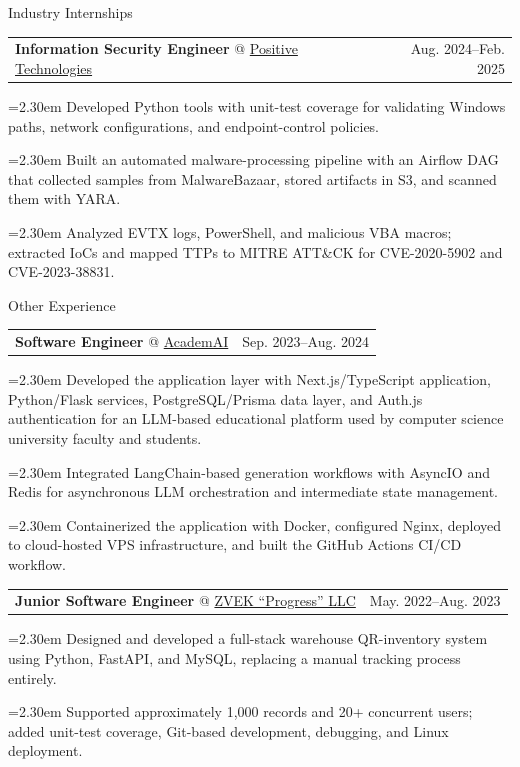 \documentclass[11pt,a4paper]{article}
\makeatletter
\newcommand{\cvrow}[2]{%
  \noindent
  \begin{minipage}[t]{0.145\textwidth}
    \vspace{0pt}%
    \raggedright
    \fontsize{10.5}{12.5}\selectfont
    #1
  \end{minipage}%
  \hfill
  \begin{minipage}[t]{0.835\textwidth}
    \vspace{0pt}%
    #2
  \end{minipage}\par
}
\newcommand{\workentry}[2]{%
  \noindent
  \begin{tabularx}{\linewidth}
    {@{}X@{\hspace{0.8em}}r@{}}
    #1 & \small #2
  \end{tabularx}\par
  \vspace{0.15em}
}
\newcommand{\workproject}[1]{%
  \noindent
  \hangindent=2.30em
  \hangafter=1
  \hspace*{1.15em}\makebox[1.15em][l]{$\diamond$}#1\par
  \vspace{0.12em}
}
\makeatother
\begin{document}
\cvrow{Industry Internships}{%
  \workentry
    {\textbf{Information Security Engineer} @
    \href{https://global.ptsecurity.com/en/}{Positive Technologies}}
    {Aug. 2024--Feb. 2025}

  \workproject{Developed Python tools with unit-test coverage for validating
  Windows paths, network configurations, and endpoint-control policies.}
  \workproject{Built an automated malware-processing pipeline with an Airflow DAG
  that collected samples from MalwareBazaar, stored artifacts in S3, and scanned
  them with YARA.}
  \workproject{Analyzed EVTX logs, PowerShell, and malicious VBA macros; extracted
  IoCs and mapped TTPs to MITRE ATT\&CK for CVE-2020-5902 and CVE-2023-38831.}
}

\vspace{0.50em}

\cvrow{Other Experience}{%
  \workentry
    {\textbf{Software Engineer} @ \href{https://academai.ru/}{AcademAI}}
    {Sep. 2023--Aug. 2024}
  \workproject{Developed the application layer with Next.js/TypeScript application,
  Python/Flask services, PostgreSQL/Prisma data layer, and Auth.js authentication
  for an LLM-based educational platform used by computer science university faculty
  and students.}
  \workproject{Integrated LangChain-based generation workflows with AsyncIO and Redis for
  asynchronous LLM orchestration and intermediate state management.}
  \workproject{Containerized the application with Docker, configured Nginx, deployed
  to cloud-hosted VPS infrastructure, and built the GitHub Actions CI/CD workflow.}
}

\cvrow{}{%
  \workentry
    {\textbf{Junior Software Engineer} @
    \href{https://zvekprogress.ru/}{ZVEK ``Progress'' LLC}}
    {May. 2022--Aug. 2023}

  \workproject{Designed and developed a full-stack warehouse QR-inventory system
  using Python, FastAPI, and MySQL, replacing a manual tracking process entirely.}

  \workproject{Supported approximately 1,000 records and 20+ concurrent users;
  added unit-test coverage, Git-based development, debugging, and Linux deployment.}
}

\vspace{0.75em}
\end{document}
